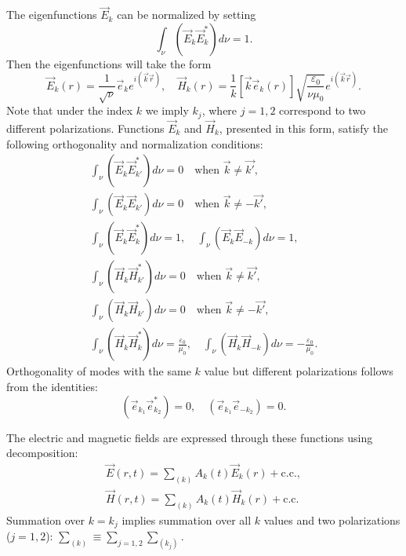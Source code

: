 The eigenfunctions $\vec{E}_k$ can be normalized by setting
\begin{equation}
\int_{\nu} \left( \vec{E}_k \vec{E}_{k}^{*} \right) d \nu = 1.
\end{equation}
Then the eigenfunctions will take the form
\[
\vec{E}_k\left(r\right) = \frac{1}{\sqrt{\nu}}\vec{e}_k e^{i \left( \vec{k}\vec{r}\right)},
\quad
\vec{H}_k\left(r\right) =
\frac{1}{k}
\left[\vec{k}\vec{e}_k\left(r\right)\right]
\sqrt{\frac{\varepsilon_0}{\nu \mu_0}}
e^{i \left( \vec{k}\vec{r}\right)}.
\]
Note that under the index $k$ we imply $k_j$, where $j = 1, 2$ correspond to two different polarizations.
Functions $\vec{E}_k$ and $\vec{H}_k$, presented in this form,
satisfy the following orthogonality and normalization conditions:
\begin{eqnarray}
\int_{\nu} \left( \vec{E}_k \vec{E}_{k'}^{*} \right) d \nu = 0
\quad
\mbox{when } \vec{k} \ne \vec{k'},
\nonumber \\
\int_{\nu} \left( \vec{E}_k \vec{E}_{k'} \right) d \nu = 0
\quad
\mbox{when } \vec{k} \ne - \vec{k'},
\nonumber \\
\int_{\nu} \left( \vec{E}_k \vec{E}_{k}^{*} \right) d \nu = 1,
\quad
\int_{\nu} \left( \vec{E}_k \vec{E}_{-k} \right) d \nu = 1,
\nonumber \\
\int_{\nu} \left( \vec{H}_k \vec{H}_{k'}^{*} \right) d \nu = 0
\quad
\mbox{when } \vec{k} \ne \vec{k'},
\nonumber \\
\int_{\nu} \left( \vec{H}_k \vec{H}_{k'} \right) d \nu = 0
\quad
\mbox{when } \vec{k} \ne - \vec{k'},
\nonumber \\
\int_{\nu} \left( \vec{H}_k \vec{H}_{k}^{*} \right) d \nu = \frac{\varepsilon_0}{\mu_0},
\quad
\int_{\nu} \left( \vec{H}_k \vec{H}_{-k} \right) d \nu = - \frac{\varepsilon_0}{\mu_0}.
\label{eqCh1_task2}
\end{eqnarray}
Orthogonality of modes with the same $k$ value but different polarizations follows from the identities:
\[
\left(\vec{e}_{k_1} \vec{e}_{k_2}^{*}\right) = 0, \quad
\left(\vec{e}_{k_1} \vec{e}_{- k_2}\right) = 0.
\]

The electric and magnetic fields are expressed through these functions using decomposition:
\begin{eqnarray}
\vec{E}\left(r, t\right) =
\sum_{(k)}
A_k\left(t\right) \vec{E}_k\left(r\right) +
\mbox{c.c.},
\nonumber \\
\vec{H}\left(r, t\right) =
\sum_{(k)}
A_k\left(t\right) \vec{H}_k\left(r\right) +
\mbox{c.c.}
\label{eqCh1_separation4six}
\end{eqnarray}
Summation over $k = k_j$ implies summation over all $k$ values and two polarizations ($j = 1,2$):
$\sum_{(k)} \equiv \sum_{j = 1,2} \sum_{(k_j)}$.

